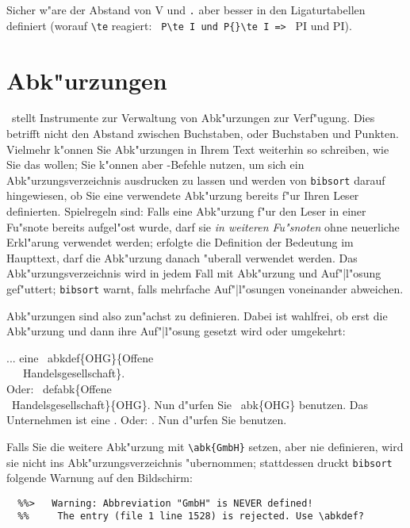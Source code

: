 \documentclass[12pt,a4paper]{article}
\newcommand{\pbs}{\string\ \unskip}
\newcommand{\bs}{\protect\pbs}
\begin{document}
\vspace{1.5ex}\noindent
Sicher w"are der Abstand von V und \hspace{-.1em}\verb|.| 
aber besser in den Ligaturtabellen definiert (worauf
\verb|\te| reagiert: \verb| P\te I und P{}\te I => | 
P\te I und P{}\te I).




\newpage
\section{Abk"urzungen}\label{Sect4}

\BibArts\ stellt Instrumente zur Verwaltung von Abk"urzungen zur Verf"ugung.
Dies betrifft nicht den Abstand zwischen Buchstaben, oder Buchstaben und
Punkten. Vielmehr k"onnen Sie Abk"urzungen in Ihrem Text weiterhin so
schreiben, wie Sie das wollen; Sie k"onnen aber \BibArts-Befehle nutzen, um
sich ein Abk"urzungsverzeichnis ausdrucken zu lassen und werden von
\verb|bibsort| darauf hingewiesen, ob Sie eine verwendete Abk"urzung bereits
f"ur Ihren Leser definierten. Spielregeln sind: Falls eine Abk"urzung f"ur
den Leser in einer Fu"snote bereits aufgel"ost wurde, darf sie \textit{in weiteren
Fu"snoten} ohne neuerliche Erkl"arung verwendet werden; erfolgte die
Definition der Bedeutung im Haupttext, darf die Abk"urzung danach "uberall
verwendet werden. Das Abk"urzungsverzeichnis wird in jedem Fall mit
Abk"urzung und Auf"|l"osung gef"uttert; \verb|bibsort| warnt, falls mehrfache
Auf"|l"osungen voneinander abweichen.

Abk"urzungen sind also zun"achst zu definieren. Dabei ist wahlfrei, ob erst
die Abk"urzung und dann ihre Auf"|l"osung gesetzt wird oder umgekehrt: 

\Doppelbox
{... eine
 \bs abkdef\{OHG\}\{Offene 
 \\ \ \ \ Handelsgesellschaft\}.
 \\ Oder: \bs defabk\{Offene 
 \\ \ Handelsgesellschaft\}\{OHG\}.
 Nun d"urfen Sie \bs abk\{OHG\} benutzen.
}
{Das Unternehmen ist eine 
 .
 Oder: .
 Nun d"urfen Sie  benutzen.
}\label{defabk}
 

\noindent
Falls Sie die weitere Abk"urzung  mit \verb|\abk{GmbH}| setzen,
aber nie definieren, wird sie nicht ins Abk"urzungsverzeichnis "ubernommen; 
stattdessen druckt \verb|bibsort| folgende Warnung auf den Bildschirm: 

\vspace{-.5ex}
{\scriptsize\begin{verbatim}
  %%>   Warning: Abbreviation "GmbH" is NEVER defined!
  %%     The entry (file 1 line 1528) is rejected. Use \abkdef?
\end{verbatim}}
\end{document}
